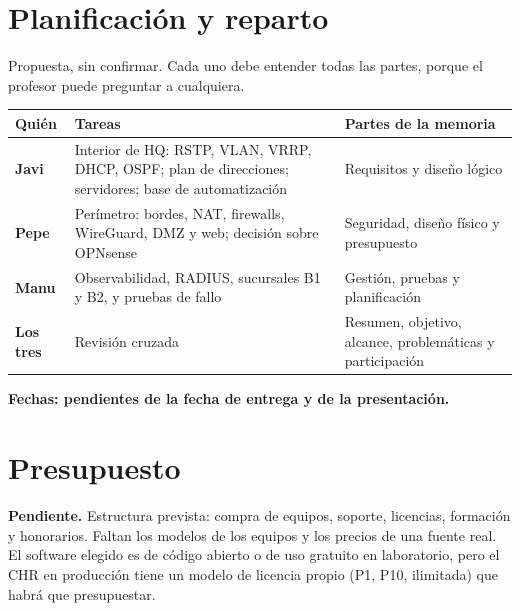 \documentclass[11pt,a4paper]{article}
\begin{document}
\section{Planificación y reparto}\label{sec:plan}
Propuesta, sin confirmar. Cada uno debe entender todas las partes, porque el profesor puede preguntar a cualquiera.
\begingroup\footnotesize
\begin{longtable}{@{}p{1.6cm}p{9.4cm}p{5.5cm}@{}}
\toprule
\textbf{Quién} & \textbf{Tareas} & \textbf{Partes de la memoria}\\
\midrule
\endhead
\textbf{Javi} & Interior de HQ: RSTP, VLAN, VRRP, DHCP, OSPF; plan de direcciones; servidores; base de automatización & Requisitos y diseño lógico\\
\textbf{Pepe} & Perímetro: bordes, NAT, firewalls, WireGuard, DMZ y web; decisión sobre OPNsense & Seguridad, diseño físico y presupuesto\\
\textbf{Manu} & Observabilidad, RADIUS, sucursales B1 y B2, y pruebas de fallo & Gestión, pruebas y planificación\\
\textbf{Los tres} & Revisión cruzada & Resumen, objetivo, alcance, problemáticas y participación\\
\bottomrule
\end{longtable}
\endgroup
\textbf{Fechas: pendientes de la fecha de entrega y de la presentación.}

\section{Presupuesto}
\textbf{Pendiente.} Estructura prevista: compra de equipos, soporte, licencias, formación y honorarios. Faltan los modelos de los equipos y los precios de una fuente real. El software elegido es de código abierto o de uso gratuito en laboratorio, pero el CHR en producción tiene un modelo de licencia propio (P1, P10, ilimitada) que habrá que presupuestar.
\end{document}
